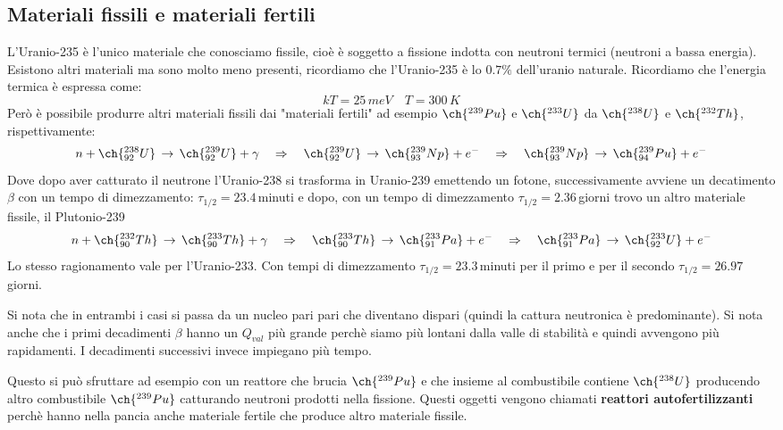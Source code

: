 \subsection{Materiali fissili e materiali fertili}
L'Uranio-235 è l'unico materiale che conosciamo fissile, cioè è soggetto a fissione indotta con neutroni termici (neutroni a bassa energia). Esistono altri materiali ma sono molto meno presenti, ricordiamo che l'Uranio-235 è lo $0.7\%$ dell'uranio naturale. Ricordiamo che l'energia termica è espressa come: 
\begin{equation*}
    kT=25\,meV\quad T=300\,K
\end{equation*}
Però è possibile produrre altri materiali fissili dai "materiali fertili" ad esempio $\ch{^{239}Pu}$ e $\ch{^{233}U}$ da $\ch{^{238}U}$ e $\ch{^{232}Th}$, rispettivamente:
\begin{equation*}
    n+\ch{^{238}_{92}U}\,\to\,\ch{^{239}_{92}U}+\gamma \quad \Rightarrow\quad \ch{^{239}_{92}U}\,\to\, \ch{^{239}_{93}Np}+e^- \quad \Rightarrow\quad \ch{^{239}_{93}Np}\,\to\, \ch{^{239}_{94}Pu}+e^-
\end{equation*}
Dove dopo aver catturato il neutrone l'Uranio-238 si trasforma in Uranio-239 emettendo un fotone, successivamente avviene un decatimento $\beta$ con un tempo di dimezzamento: $\tau_{1/2}=23.4\,$minuti e dopo, con un tempo di dimezzamento $\tau_{1/2}=2.36\,$giorni trovo un altro materiale fissile, il Plutonio-239
\begin{equation*}
    n+\ch{^{232}_{90}Th}\,\to\,\ch{^{233}_{90}Th}+\gamma \quad \Rightarrow\quad \ch{^{233}_{90}Th}\,\to\, \ch{^{233}_{91}Pa}+e^- \quad \Rightarrow\quad \ch{^{233}_{91}Pa}\,\to\, \ch{^{233}_{92}U}+e^-
\end{equation*}
Lo stesso ragionamento vale per l'Uranio-233. Con tempi di dimezzamento $\tau_{1/2}=23.3\,$minuti per il primo e per il secondo $\tau_{1/2}=26.97\,$giorni.

Si nota che in entrambi i casi si passa da un nucleo pari pari che diventano dispari (quindi la cattura neutronica è predominante). Si nota anche che i primi decadimenti $\beta$ hanno un $Q_{val}$ più grande perchè siamo più lontani dalla valle di stabilità e quindi avvengono più rapidamenti. I decadimenti successivi invece impiegano più tempo.

Questo si può sfruttare ad esempio con un reattore che brucia $\ch{^{239}Pu}$ e che insieme al combustibile contiene $\ch{^{238}U}$ producendo altro combustibile $\ch{^{239}Pu}$ catturando neutroni prodotti nella fissione. Questi oggetti vengono chiamati \textbf{reattori autofertilizzanti} perchè hanno nella pancia anche materiale fertile che produce altro materiale fissile.
